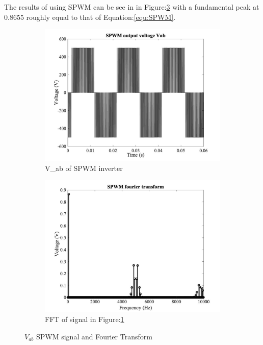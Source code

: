 \documentclass{article}
\begin{document}
The results of using SPWM can be see in in Figure:\ref{fig:fig2} with a fundamental peak at 0.8655 roughly equal to that of Equation:\ref{equ:SPWM}.
\begin{figure}[H]
\begin{subfigure}{.5\textwidth}
  \centering
\includegraphics[scale=0.15]{three.jpg}
\caption{V_{ab} of SPWM inverter}
\label{fig:signalTwo}
\end{subfigure}%
\begin{subfigure}{.5\textwidth}
  \centering
\includegraphics[scale=0.15]{four.jpg}
\caption{FFT of signal in Figure:\ref{fig:signalTwo} }
\label{fig:fftOne}
\end{subfigure}
\caption{$V_{ab}$ SPWM signal and Fourier Transform}
\label{fig:fig2}
\end{figure}
\end{document}

